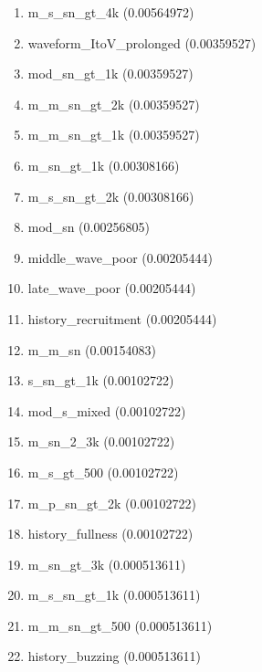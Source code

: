 \begin{enumerate}
\item m\_s\_sn\_gt\_4k (0.00564972)
\item waveform\_ItoV\_prolonged (0.00359527)
\item mod\_sn\_gt\_1k (0.00359527)
\item m\_m\_sn\_gt\_2k (0.00359527)
\item m\_m\_sn\_gt\_1k (0.00359527)
\item m\_sn\_gt\_1k (0.00308166)
\item m\_s\_sn\_gt\_2k (0.00308166)
\item mod\_sn (0.00256805)
\item middle\_wave\_poor (0.00205444)
\item late\_wave\_poor (0.00205444)
\item history\_recruitment (0.00205444)
\item m\_m\_sn (0.00154083)
\item s\_sn\_gt\_1k (0.00102722)
\item mod\_s\_mixed (0.00102722)
\item m\_sn\_2\_3k (0.00102722)
\item m\_s\_gt\_500 (0.00102722)
\item m\_p\_sn\_gt\_2k (0.00102722)
\item history\_fullness (0.00102722)
\item m\_sn\_gt\_3k (0.000513611)
\item m\_s\_sn\_gt\_1k (0.000513611)
\item m\_m\_sn\_gt\_500 (0.000513611)
\item history\_buzzing (0.000513611)
\end{enumerate}